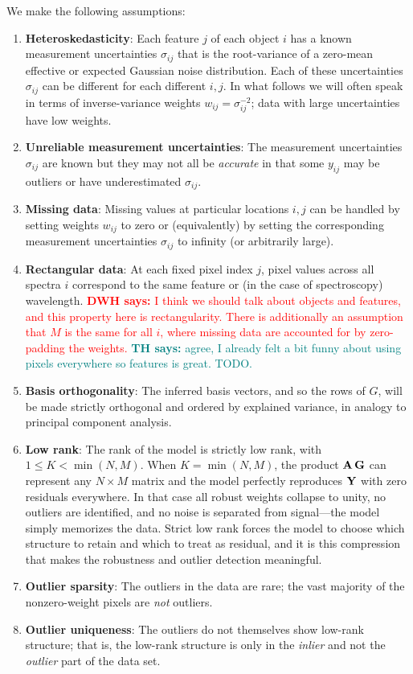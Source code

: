 \documentclass[onecolumn,floatfix]{aastex631}
\newcommand{\tom}[1]{\textcolor{teal}{\textbf{TH says:} #1}}
\newcommand{\hogg}[1]{\textcolor{red}{\textbf{DWH says:} #1}}
\begin{document}
We make the following assumptions:
\begin{enumerate}
    \item \textbf{Heteroskedasticity}: Each feature $j$ of each object $i$ has a known measurement uncertainties $\sigma_{ij}$ that is the root-variance of a zero-mean effective or expected Gaussian noise distribution. Each of these uncertainties $\sigma_{ij}$ can be different for each different $i,j$. In what follows we will often speak in terms of inverse-variance weights $w_{ij}=\sigma_{ij}^{-2}$; data with large uncertainties have low weights.
    \item \textbf{Unreliable measurement uncertainties}: The measurement uncertainties $\sigma_{ij}$ are known but they may not all be \emph{accurate} in that some $y_{ij}$ may be outliers or have underestimated $\sigma_{ij}$.
    \item \textbf{Missing data}: Missing values at particular locations $i, j$ can be handled by setting weights $w_{ij}$ to zero or (equivalently) by setting the corresponding measurement uncertainties $\sigma_{ij}$ to infinity (or arbitrarily large).
    \item \textbf{Rectangular data}: At each fixed pixel index $j$, pixel values across all spectra $i$ correspond to the same feature or (in the case of spectroscopy) wavelength. \hogg{I think we should talk about objects and features, and this property here is rectangularity. There is additionally an assumption that $M$ is the same for all $i$, where missing data are accounted for by zero-padding the weights.} \tom{agree, I already felt a bit funny about using pixels everywhere so features is great. TODO.}
    \item \textbf{Basis orthogonality}: The inferred basis vectors, and so the rows of $G$, will be made strictly orthogonal and ordered by explained variance, in analogy to principal component analysis.
      \item \textbf{Low rank}: The rank of the model is strictly low rank, with $1 \le K < \min(N, M)$. When $K = \min(N, M)$, the product ${\bf A}\,{\bf G}$ can represent any $N \times M$ matrix and the model perfectly reproduces ${\bf Y}$ with zero residuals everywhere. In that case all robust weights collapse to unity, no outliers are identified, and no noise is separated from signal---the model simply memorizes the data. Strict low rank forces the model to choose which structure to retain and which to treat as residual, and it is this compression that makes the robustness and outlier detection meaningful.
    \item \textbf{Outlier sparsity}: The outliers in the data are rare; the vast majority of the nonzero-weight pixels are \emph{not} outliers.
    \item \textbf{Outlier uniqueness}: The outliers do not themselves show low-rank structure; that is, the low-rank structure is only in the \emph{inlier} and not the \emph{outlier} part of the data set.
\end{enumerate}
\end{document}
